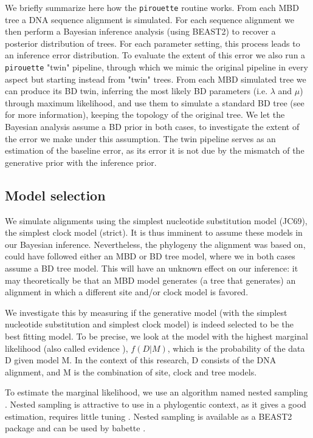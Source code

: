 We briefly summarize here how the \verb;pirouette; routine works.
From each MBD tree a DNA sequence alignment is simulated. 
For each sequence alignment we then perform a Bayesian inference 
analysis (using BEAST2) to recover a posterior distribution of trees. 
For each parameter setting, this process leads to an inference error 
distribution. To evaluate the extent of this error we also run 
a \verb;pirouette; "twin" pipeline, through which we mimic the original 
pipeline in every aspect but starting instead from "twin" trees.
From each MBD simulated tree we can produce its BD twin, inferring the most 
likely BD parameters (i.e. $\lambda$ and $\mu$) through maximum likelihood, 
and use them to simulate a standard BD tree (see \cite{pirouette} for more 
information), keeping the topology of the original tree.
We let the Bayesian analysis assume a BD prior in both cases, to investigate 
the extent of the error we make under this assumption. The twin pipeline 
serves as an estimation of the baseline error, as its error it is not due by 
the mismatch of the generative prior with the inference prior.

\iffalse
\subsection{Model selection}

We simulate alignments using the simplest nucleotide substitution model (JC69),
the simplest clock model (strict). It is thus imminent to assume these
models in our Bayesian inference. Nevertheless, the phylogeny the alignment
was based on, could have followed either an MBD or BD tree model, 
where we in both cases assume a BD tree model. This will have 
an unknown effect on our inference: it may theoretically be that an MBD model
generates (a tree that generates) an alignment in which a different site 
and/or clock model is favored. 

We investigate this by measuring if the generative model (with the simplest
nucleotide substitution and simplest clock model) is indeed selected 
to be the best fitting model. 
To be precise, we look at the model 
with the highest marginal likelihood 
(also called evidence \cite{mackay2003information}),
$f(D|M)$, which is the probability of the data D given model M.
In the context of this research, D consists of the DNA alignment,
and M is the combination of site, clock and tree models.

To estimate the marginal likelihood, 
we use an algorithm named nested sampling \cite{skilling2006nested}.
Nested sampling is attractive to use
in a phylogentic context, as it gives a good estimation,
requires little tuning \cite{maturana2018}.
Nested sampling is available as a BEAST2 package
and can be used by babette \cite{babette}.

